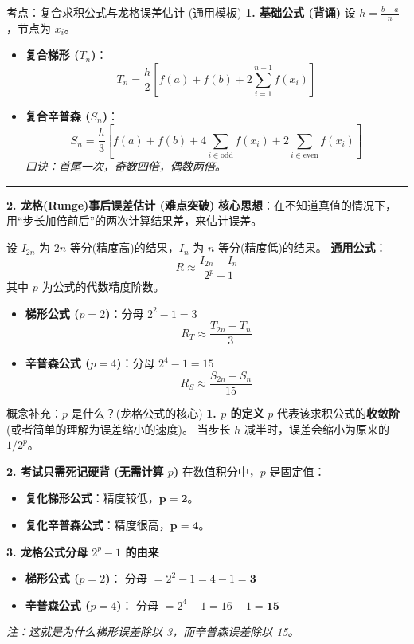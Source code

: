 \documentclass[12pt, a4paper]{article}
\begin{document}
\begin{knowpoint}{考点：复合求积公式与龙格误差估计 (通用模板)}
    \textbf{1. 基础公式 (背诵)}
    设 $h = \frac{b-a}{n}$，节点为 $x_i$。
    \begin{itemize}
        \item \textbf{复合梯形 ($T_n$)}：
        \[ T_n = \frac{h}{2} \left[ f(a) + f(b) + 2\sum_{i=1}^{n-1} f(x_i) \right] \]
        \item \textbf{复合辛普森 ($S_n$)}：
        \[ S_n = \frac{h}{3} \left[ f(a) + f(b) + 4\sum_{i \in \text{odd}} f(x_i) + 2\sum_{i \in \text{even}} f(x_i) \right] \]
        \textit{口诀：首尾一次，奇数四倍，偶数两倍。}
    \end{itemize}

    \vspace{0.5em}
    \hrule
    \vspace{0.5em}

    \textbf{2. 龙格(Runge)事后误差估计 (难点突破)}
    \textbf{核心思想}：在不知道真值的情况下，用“步长加倍前后”的两次计算结果差，来估计误差。
    
    设 $I_{2n}$ 为 $2n$ 等分(精度高)的结果，$I_n$ 为 $n$ 等分(精度低)的结果。
    \textbf{通用公式}：
    \[ R \approx \frac{I_{2n} - I_n}{2^p - 1} \]
    其中 $p$ 为公式的代数精度阶数。
    
    \begin{itemize}
        \item \textbf{梯形公式 ($p=2$)}：分母 $2^2 - 1 = 3$
        \[ \boxed{ R_{T} \approx \frac{T_{2n} - T_n}{3} } \]
        \item \textbf{辛普森公式 ($p=4$)}：分母 $2^4 - 1 = 15$
        \[ \boxed{ R_{S} \approx \frac{S_{2n} - S_n}{15} } \]
    \end{itemize}
\end{knowpoint}

\begin{knowpoint}{概念补充：$p$ 是什么？(龙格公式的核心)}
    \textbf{1. $p$ 的定义}
    $p$ 代表该求积公式的\textbf{收敛阶} (或者简单的理解为误差缩小的速度)。
    当步长 $h$ 减半时，误差会缩小为原来的 $1/2^p$。
    
    \textbf{2. 考试只需死记硬背 (无需计算 $p$)}
    在数值积分中，$p$ 是固定值：
    \begin{itemize}
        \item \textbf{复化梯形公式}：精度较低，$\mathbf{p=2}$。
        \item \textbf{复化辛普森公式}：精度很高，$\mathbf{p=4}$。
    \end{itemize}

    \textbf{3. 龙格公式分母 $2^p-1$ 的由来}
    \begin{itemize}
        \item \textbf{梯形公式 ($p=2$)}：
        分母 $= 2^2 - 1 = 4 - 1 = \mathbf{3}$
        \item \textbf{辛普森公式 ($p=4$)}：
        分母 $= 2^4 - 1 = 16 - 1 = \mathbf{15}$
    \end{itemize}
    \textit{注：这就是为什么梯形误差除以 3，而辛普森误差除以 15。}
\end{knowpoint}
\end{document}
